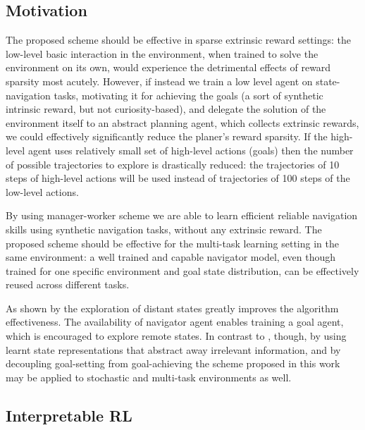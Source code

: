 \documentclass[acmsmall, nonacm]{acmart}
\begin{document}
\subsection{Motivation}

The proposed scheme should be effective in sparse extrinsic reward settings: the low-level basic interaction in the environment, when trained to solve the environment on its own, would experience the detrimental effects of reward sparsity most acutely. However, if instead we train a low level agent on state-navigation tasks, motivating it for achieving the goals (a sort of synthetic intrinsic reward, but not curiosity-based), and delegate the solution of the environment itself to an abstract planning agent, which collects extrinsic rewards, we could effectively significantly reduce the planer's reward sparsity. If the high-level agent uses relatively small set of high-level actions (goals) then the number of possible trajectories to explore is drastically reduced: the trajectories of 10 steps of high-level actions will be used instead of trajectories of 100 steps of the low-level actions.

By using manager-worker scheme we are able to learn efficient reliable navigation skills using synthetic navigation tasks, 
without any extrinsic reward.
%
The proposed scheme should be effective for the multi-task learning setting in the same environment: a well trained and capable navigator model, even though trained for one specific environment and goal state distribution, can be effectively reused across different tasks.

As shown by \citet{ecoffet_first_2021} the exploration of distant states greatly improves the algorithm effectiveness. The availability of navigator agent enables training a goal agent, which is encouraged to explore remote states.
%
In contrast to \citep{ecoffet_first_2021}, though, by using learnt state representations that abstract away irrelevant information, and by decoupling goal-setting from goal-achieving the scheme proposed in this work may be applied to stochastic and multi-task environments as well.

\subsection{Interpretable RL}
\end{document}
